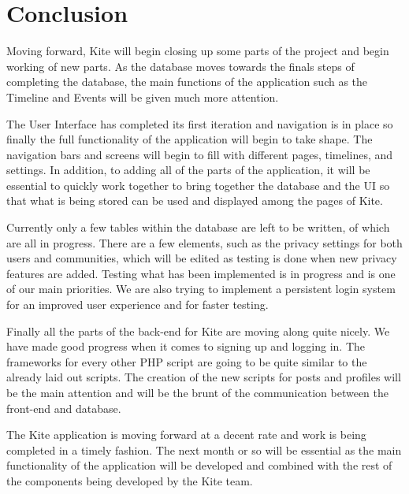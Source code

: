 \documentclass[compsoc, 10, draftclsnofoot, onecolumn]{IEEEtran}
\begin{document}
\section{Conclusion}
Moving forward, Kite will begin closing up some parts of the project and begin working of new parts. As the database moves towards the finals steps of completing the database, the main functions of the application such as the Timeline and Events will be given much more attention.

The User Interface has completed its first iteration and navigation is in place so finally the full functionality of the application will begin to take shape. The navigation bars and screens will begin to fill with different pages, timelines, and settings. In addition, to adding all of the parts of the application, it will be essential to quickly work together to bring together the database and the UI so that what is being stored can be used and displayed among the pages of Kite.

Currently only a few tables within the database are left to be written, of which are all in progress. There are a few elements, such as the privacy settings for both users and communities, which will be edited as testing is done when new privacy features are added. Testing what has been implemented is in progress and is one of our main priorities. We are also trying to implement a persistent login system for an improved user experience and for faster testing.

Finally all the parts of the back-end for Kite are moving along quite nicely. We have made good progress when it comes to signing up and logging in. The frameworks for every other PHP script are going to be quite similar to the already laid out scripts. The creation of the new scripts for posts and profiles will be the main attention and will be the brunt of the communication between the front-end and database. 

The Kite application is moving forward at a decent rate and work is being completed in a timely fashion. The next month or so will be essential as the main functionality of the application will be developed and combined with the rest of the components being developed by the Kite team.  
\end{document}
